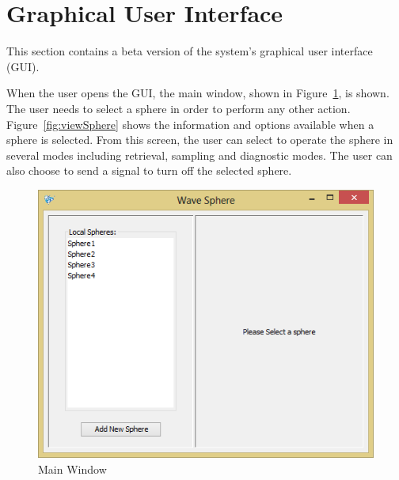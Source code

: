 \section{Graphical User Interface}

This section contains a beta version of the system's graphical user interface (GUI).

When the user opens the GUI, the main window, shown in Figure~\ref{fig:mainWindow}, is shown. The user needs to select a sphere in order to perform any other action.  Figure~\ref{fig:viewSphere} shows the information and options available when a sphere is selected. From this screen, the user can select to operate the sphere in several modes including retrieval, sampling and diagnostic modes.  The user can also choose to send a signal to turn off the selected sphere.
\begin{figure}[H]
	\centering
	\includegraphics[scale=0.7]{img/mainWindow}
	\caption{Main Window \label{fig:mainWindow}}
\end{figure}

